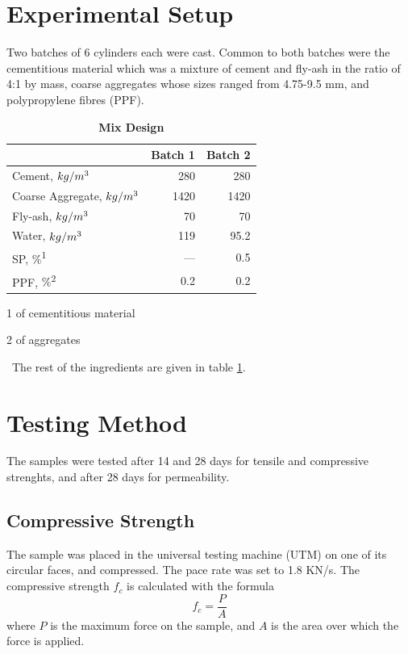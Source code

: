 \documentclass{ieeeaccess}
\begin{document}
\section{Experimental Setup}
Two batches of 6 cylinders each were cast. Common to both batches were the
cementitious material which was a mixture of cement and fly-ash in the ratio of 
4:1 by mass, coarse aggregates whose sizes ranged from 4.75-9.5 mm, 
and polypropylene fibres (PPF). 
\
\begin{table}
    \begin{threeparttable}
        \caption{\textbf{Mix Design}}
        \label{table:mix-design}
        \setlength{\tabcolsep}{20pt}
        \def\arraystretch{1.5}%
        \begin{tabular}{ l r  r }
            \hline
            & \multicolumn{1}{c}{Batch 1} & \multicolumn{1}{c}{Batch 2} \\
            \hline
            Cement, $kg/m\textsuperscript{3}$  & 280  & 280  \\
            Coarse Aggregate, $kg/m\textsuperscript{3}$ & 1420 & 1420 \\
            Fly-ash, $kg/m\textsuperscript{3}$ & 70   & 70   \\
            Water, $kg/m\textsuperscript{3}$   & 119  & 95.2 \\
            SP, $\%$\textsuperscript{1}        & ---  & 0.5  \\
            PPF, $\%$\textsuperscript{2}       & 0.2  & 0.2  \\
            \hline
        \end{tabular} 
        \begin{tablenotes}
            \item[1] \footnotesize of cementitious material
            \item[2] \footnotesize of aggregates
        \end{tablenotes}
    \end{threeparttable}
\end{table}
\
The rest of the ingredients are given in table \ref{table:mix-design}.

\section{Testing Method}
The samples were tested after 14 and 28 days for tensile and compressive 
strenghts, and after 28 days for permeability.

\subsection{Compressive Strength}
The sample was placed in the universal testing machine (UTM) on one of its 
circular faces, and compressed. The pace rate was set to 1.8 KN/s. 
The compressive strength $f_c$ is calculated with the formula 
\[f_c = \frac{P}{A}\] where $P$ is the maximum force on the sample, and $A$ is
the area over which the force is applied.
\end{document}

